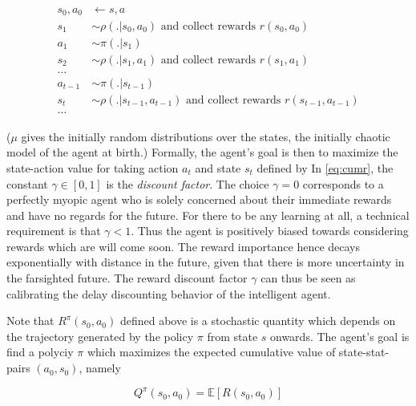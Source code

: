 \documentclass{article} %
\begin{document}
\begin{eqnarray*}
  \begin{split}
    s_0, a_0 &\leftarrow s, a\\
    s_1 &\sim \rho(.|s_0,a_0) \text{ and collect rewards }r(s_0, a_0)\\
    a_1 &\sim \pi(.|s_1)\\
    s_2 &\sim \rho(.|s_1,a_1) \text{ and collect rewards }r(s_1, a_1)\\
    \ldots\\
    a_{t-1} &\sim \pi(.|s_{t-1})\\
    s_{t} &\sim \rho(.|s_{t-1},a_{t-1}) \text{ and collect rewards }r(s_{t-1}, a_{t-1})\\
    \ldots
  \end{split}
\end{eqnarray*}

($\mu$ gives the initially random distributions over the states,
the initially chaotic model of the agent at birth.)
Formally, the agent's goal is then to maximize the state-action value for
taking action $a_t$ and state $s_t$ defined by
In \eqref{eq:cumr}, the constant $\gamma \in [0, 1]$ is the \textit{discount factor}. The choice $\gamma = 0$   corresponds to a perfectly myopic agent who is solely concerned about their immediate rewards and have no regards for the future. For there to be any learning at all, a technical requirement is that $\gamma < 1$.
Thus the agent is positively biased towards considering rewards which are will
come soon. The reward importance hence decays exponentially
with distance in the future,
given that there is more uncertainty in the farsighted future.
The reward discount factor $\gamma$ can thus be seen as calibrating
the delay discounting behavior of the intelligent agent.

Note that $R^\pi(s_0, a_0)$ defined above is a stochastic quantity which depends on the trajectory generated by the policy $\pi$ from state $s$ onwards.
The agent's goal is find a polyciy $\pi$ which maximizes the expected cumulative value of state-stat-pairs $(a_0,s_0)$, namely

\begin{equation}
  \label{eq:qval}
  Q^{\pi}(s_0,a_0) = \mathbb E [R(s_0, a_0)]
\end{equation}
\end{document}
